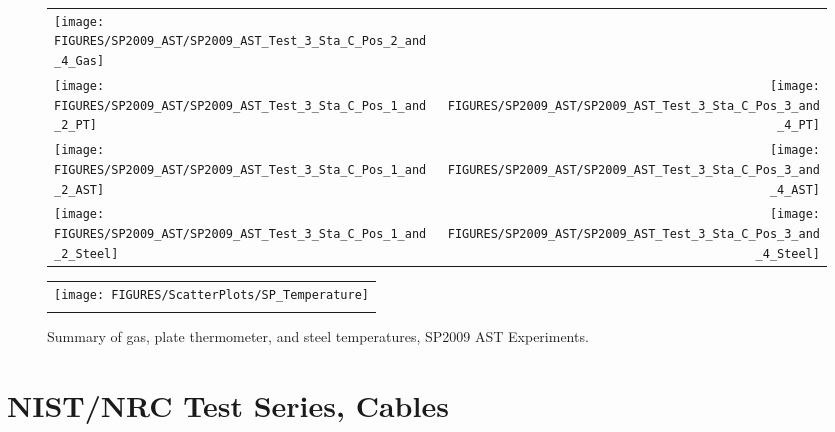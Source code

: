 \begin{figure}[p]
\begin{tabular*}{\textwidth}{l@{\extracolsep{\fill}}r}
\texttt{[image: FIGURES/SP2009\_AST/SP2009\_AST\_Test\_3\_Sta\_C\_Pos\_2\_and\_4\_Gas]} &
  \\
\texttt{[image: FIGURES/SP2009\_AST/SP2009\_AST\_Test\_3\_Sta\_C\_Pos\_1\_and\_2\_PT]} &
\texttt{[image: FIGURES/SP2009\_AST/SP2009\_AST\_Test\_3\_Sta\_C\_Pos\_3\_and\_4\_PT]} \\
\texttt{[image: FIGURES/SP2009\_AST/SP2009\_AST\_Test\_3\_Sta\_C\_Pos\_1\_and\_2\_AST]} &
\texttt{[image: FIGURES/SP2009\_AST/SP2009\_AST\_Test\_3\_Sta\_C\_Pos\_3\_and\_4\_AST]} \\
\texttt{[image: FIGURES/SP2009\_AST/SP2009\_AST\_Test\_3\_Sta\_C\_Pos\_1\_and\_2\_Steel]} &
\texttt{[image: FIGURES/SP2009\_AST/SP2009\_AST\_Test\_3\_Sta\_C\_Pos\_3\_and\_4\_Steel]}
\end{tabular*}
\label{SP_Test_3_Station_C}
\end{figure}





\begin{figure}[p]
\begin{center}
\begin{tabular}{c}
\texttt{[image: FIGURES/ScatterPlots/SP\_Temperature]} \\
\vspace{0.25in}
\end{tabular}
\end{center}
\caption[Summary of gas, plate thermometer, and steel temperatures, SP2009 AST Experiments.]
{Summary of gas, plate thermometer, and steel temperatures, SP2009 AST Experiments.}
\end{figure}

\clearpage

\section{NIST/NRC Test Series, Cables}

